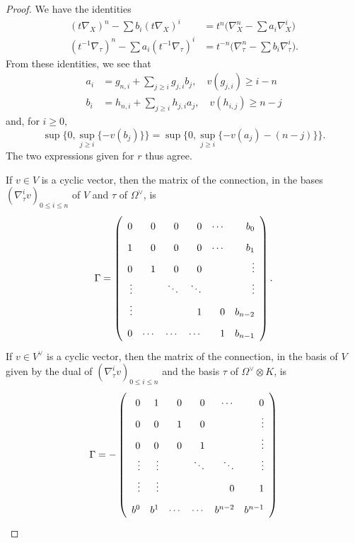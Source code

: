 \documentclass{report}
\renewcommand{\geq}{\geqslant}
\renewcommand{\leq}{\leqslant}
\newcommand{\oldpage}[1]{\marginpar{\footnotesize$\Big\vert$ \textit{p.~#1}}}
\begin{document}
\begin{proof}
  We have the identities
  \[
    \begin{aligned}
      (t\nabla_X)^n-\sum b_i(t\nabla_X)^i &= t^n\big(\nabla_X^n-\sum a_i\nabla_X^i\big)
    \\(t^{-1}\nabla_\tau)^n-\sum a_i(t^{-1}\nabla_\tau)^i &= t^{-n}\big(\nabla_\tau^n-\sum b_i\nabla_\tau^i\big).
    \end{aligned}
  \]
  From these identities, we see that
  \[
    \begin{aligned}
      a_i &= g_{n,i}+\sum_{j\geq i}g_{j,i}b_j,
      \quad v(g_{j,i})\geq i-n
    \\b_i &= h_{n,i}+\sum_{j\geq i}h_{j,i}a_j,
      \quad v(h_{i,j})\geq n-j
    \end{aligned}
  \]
  and, for $i\geq0$,
  \[
    \sup\{0,\sup_{j\geq i}\{-v(b_j)\}\} = \sup\{0,\sup_{j\geq i}\{-v(a_j)-(n-j)\}\}.
  \]
  The two expressions given for $r$ thus agree.

  If $v\in V$ is a cyclic vector, then the matrix of the connection, in the bases $(\nabla_\tau^i v)_{0\leq i\leq n}$ of $V$ and $\tau$ of $\Omega^\vee$, is
  \oldpage{50}
  \[
    \Gamma =
    \left(
      \def\arraystretch{1.8}
      \begin{array}{rrrrrr}
        0 & 0 & 0 & 0 & \cdots & b_0
      \\1 & 0 & 0 & 0 & \cdots & b_1
      \\0 & 1 & 0 & 0 & & \vdots
      \\\vdots & & \ddots & \ddots & & \vdots
      \\\vdots & & & 1 & 0 & b_{n-2}
      \\0 & \cdots & \cdots & \cdots & 1 & b_{n-1}
      \end{array}
    \right).
  \]
  If $v\in V^\vee$ is a cyclic vector, then the matrix of the connection, in the basis of $V$ given by the dual of $(\nabla_\tau^iv)_{0\leq i\leq n}$ and the basis $\tau$ of $\Omega^\vee\otimes K$, is
  \[
    \Gamma =
    -\left(
      \def\arraystretch{1.8}
      \begin{array}{rrrrrr}
        0 & 1 & 0 & 0 & \cdots & 0
      \\0 & 0 & 1 & 0 & & \vdots
      \\0 & 0 & 0 & 1 & & \vdots
      \\\vdots & \vdots & & \ddots & \ddots & \vdots
      \\\vdots & \vdots & & & 0 & 1
      \\b^0 & b^1 & \cdots & \cdots & b^{n-2} & b^{n-1}
      \end{array}
    \right)
  \]


\end{proof}
\end{document}
